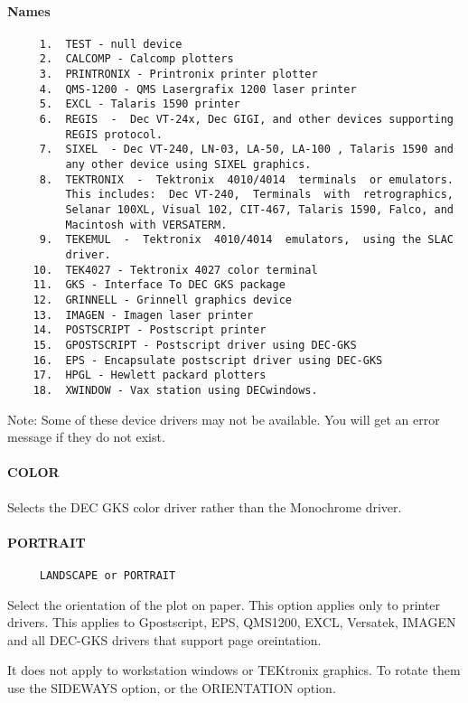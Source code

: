 \paragraph{Names}
\begin{verbatim}
     1.  TEST - null device 
     2.  CALCOMP - Calcomp plotters 
     3.  PRINTRONIX - Printronix printer plotter 
     4.  QMS-1200 - QMS Lasergrafix 1200 laser printer 
     5.  EXCL - Talaris 1590 printer 
     6.  REGIS  -  Dec VT-24x, Dec GIGI, and other devices supporting
         REGIS protocol.  
     7.  SIXEL  - Dec VT-240, LN-03, LA-50, LA-100 , Talaris 1590 and
         any other device using SIXEL graphics.  
     8.  TEKTRONIX  -  Tektronix  4010/4014  terminals  or emulators.
         This includes:  Dec VT-240,  Terminals  with  retrographics,
         Selanar 100XL, Visual 102, CIT-467, Talaris 1590, Falco, and
         Macintosh with VERSATERM.  
     9.  TEKEMUL  -  Tektronix  4010/4014  emulators,  using the SLAC
         driver.  
    10.  TEK4027 - Tektronix 4027 color terminal 
    11.  GKS - Interface To DEC GKS package 
    12.  GRINNELL - Grinnell graphics device 
    13.  IMAGEN - Imagen laser printer 
    14.  POSTSCRIPT - Postscript printer 
    15.  GPOSTSCRIPT - Postscript driver using DEC-GKS 
    16.  EPS - Encapsulate postscript driver using DEC-GKS 
    17.  HPGL - Hewlett packard plotters 
    18.  XWINDOW - Vax station using DECwindows.  
\end{verbatim}
Note:   Some  of these device drivers may not be available.  You will
get an error message if they do not exist.  
\paragraph{COLOR}
Selects the DEC GKS color driver rather than the Monochrome driver.  
\paragraph{PORTRAIT}
\begin{verbatim}
     LANDSCAPE or PORTRAIT 
\end{verbatim}
Select  the  orientation  of  the plot on paper.  This option applies
only to printer drivers.  This applies to Gpostscript, EPS,  QMS1200,
EXCL,  Versatek,  IMAGEN  and  all  DEC-GKS drivers that support page
oreintation.  

It  does  not apply to workstation windows or TEKtronix graphics.  To
rotate them use the SIDEWAYS option, or the ORIENTATION option.  

